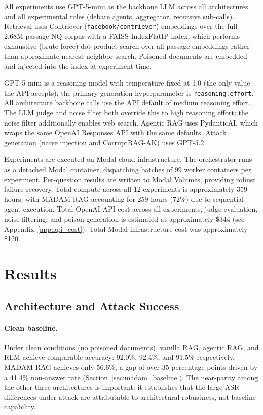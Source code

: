 \documentclass[11pt]{article}
\begin{document}
All experiments use GPT-5-mini as the backbone LLM across all architectures and all experimental roles (debate agents, aggregator, recursive sub-calls). Retrieval uses Contriever (\texttt{facebook/contriever}) embeddings over the full 2.68M-passage NQ corpus with a FAISS IndexFlatIP index, which performs exhaustive (brute-force) dot-product search over all passage embeddings rather than approximate nearest-neighbor search. Poisoned documents are embedded and injected into the index at experiment time.

GPT-5-mini is a reasoning model with temperature fixed at 1.0 (the only value the API accepts); the primary generation hyperparameter is \texttt{reasoning.effort}. All architecture backbone calls use the API default of medium reasoning effort. The LLM judge and noise filter both override this to high reasoning effort; the noise filter additionally enables web search. Agentic RAG uses PydanticAI, which wraps the same OpenAI Responses API with the same defaults. Attack generation (naive injection and CorruptRAG-AK) uses GPT-5.2.

Experiments are executed on Modal cloud infrastructure. The orchestrator runs as a detached Modal container, dispatching batches of 99 worker containers per experiment. Per-question results are written to Modal Volumes, providing robust failure recovery. Total compute across all 12 experiments is approximately 359 hours, with MADAM-RAG accounting for 259 hours (72\%) due to sequential agent execution. Total OpenAI API cost across all experiments, judge evaluation, noise filtering, and poison generation is estimated at approximately \$344 (see Appendix~\ref{app:api_cost}). Total Modal infrastructure cost was approximately \$120.


\section{Results}
\label{sec:results}

\subsection{Architecture and Attack Success}
\label{sec:asr_results}

\paragraph{Clean baseline.} Under clean conditions (no poisoned documents), vanilla RAG, agentic RAG, and RLM achieve comparable accuracy: 92.0\%, 92.4\%, and 91.5\% respectively. MADAM-RAG achieves only 56.6\%, a gap of over 35 percentage points driven by a 41.4\% non-answer rate (Section~\ref{sec:madam_baseline}). The near-parity among the other three architectures is important: it establishes that the large ASR differences under attack are attributable to architectural robustness, not baseline capability.
\end{document}
